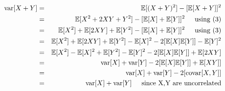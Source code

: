 \begin{eqnarray}
    \text{var}[X+Y]&=& \mathbb{E}[(X+Y)^2] - [\mathbb{E}[X+Y]]^2\\
    &=& \mathbb{E}[X^2+2XY+Y^2] - [\mathbb{E}[X]+\mathbb{E}[Y]]^2 \hspace{5mm}\mbox{using (3)}\\
    &=& \mathbb{E}[X^2]+\mathbb{E}[2XY]+\mathbb{E}[Y^2] - [\mathbb{E}[X]+\mathbb{E}[Y]]^2 \hspace{5mm}\mbox{using (3)}\\
    &=& \mathbb{E}[X^2]+\mathbb{E}[2XY]+\mathbb{E}[Y^2] - \mathbb{E}[X]^2-2[\mathbb{E}[X]\mathbb{E}[Y]] -\mathbb{E}[Y]^2 \\
    &=& \mathbb{E}[X^2]- \mathbb{E}[X]^2 +\mathbb{E}[Y^2]-\mathbb{E}[Y]^2 -2[\mathbb{E}[X]\mathbb{E}[Y]] +\mathbb{E}[2XY]  \\
    &=& \text{var}[X] +\text{var}[Y] -2[\mathbb{E}[X]\mathbb{E}[Y]] +\mathbb{E}[XY]]  \\
    &=& \text{var}[X] +\text{var}[Y] -2[\text{covar}[X,Y]]  \\
    &=& \text{var}[X] +\text{var}[Y]\hspace{5mm}\mbox{since X,Y are uncorrelated} 
\end{eqnarray}
